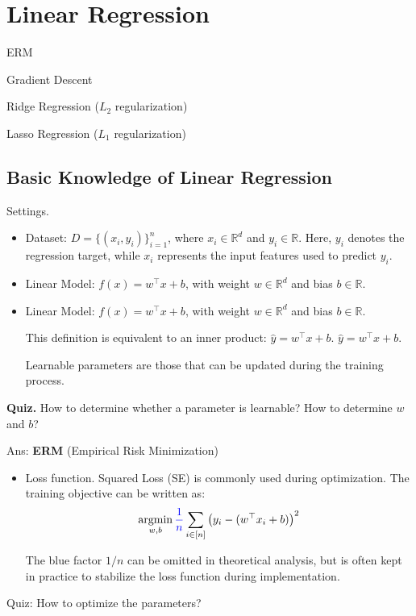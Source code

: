 \documentclass[../main]{subfiles}
\begin{document}
\chapter{Linear Regression}
\begin{introduction}
\item ERM
\item Gradient Descent
\item Ridge Regression ($L_2$ regularization)
\item Lasso Regression ($L_1$ regularization)
\end{introduction}
\section{Basic Knowledge of Linear Regression}

{Settings.}
\begin{itemize}
  \item Dataset: $D=\{(x_i,y_i)\}_{i=1}^n$, where $x_i\in\mathbb{R}^d$ and $y_i\in\mathbb{R}$.  
  Here, $y_i$ denotes the regression target, while $x_i$ represents the input features used to predict $y_i$.

  \item Linear Model: $f(x)=w^{\top}x+b$, with weight $w\in\mathbb{R}^d$ and bias $b\in\mathbb{R}$.  
  \item Linear Model: $f(x)=w^{\top}x+b$, with weight $w\in\mathbb{R}^d$ and bias $b\in\mathbb{R}$.  
  \begin{note}
    This definition is equivalent to an inner product:  
    $\hat y = w^{\top}x+b.$
    $\hat y = w^{\top}x+b.$
  \end{note}

  \begin{definition}
    Learnable parameters are those that can be updated during the training process.
  \end{definition}
\end{itemize}

\noindent\textbf{Quiz.} How to determine whether a parameter is learnable? How to determine $w$ and $b$?


\noindent Ans: \textbf{ERM} (Empirical Risk Minimization)

\begin{itemize}
  \item Loss function. Squared Loss (SE) is commonly used during optimization. The training objective can be written as:
    \begin{equation}
        \mathop{\mathrm{argmin}}_{w,b}{\color{blue}{\frac{1}{n}}}\sum_{i\in[n]}\left(y_i-(w^\top x_i+b)\right)^2
      \end{equation}
  
  The blue factor $1/n$ can be omitted in theoretical analysis, but is often kept in practice to stabilize the loss function during implementation.
\end{itemize}
Quiz: How to optimize the parameters?
\end{document}
